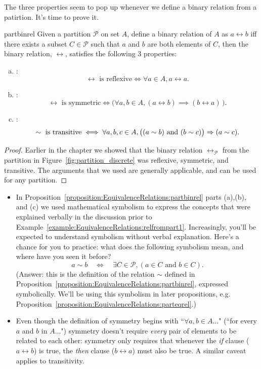 The three properties seem to pop up whenever we define a binary relation from a patirtion. It's time to prove it.

\begin{prop}{partbinrel} Given a partition $\mathcal{P}$ on set $A$, define a binary relation of $A$ as $a \rel b$ iff there exists a subset $C \in \mathcal{P}$ such that $a$ and $b$ are both elements of $C$, then the binary relation, $\rel$, satisfies the following 3 properties:
\begin{enumerate}[(a)]
\item {}:
	$$ \rel \text{ is reflexive} \iff \forall a \in A, a \rel a .$$
\item  {}:
	$$ \rel \text{ is symmetric} \iff \bigl( \forall a,b \in A,  (a \rel b) \implies (b \rel a)\, \bigr)  .$$
\item  {}:
	$$ \sim \text{ is transitive} \iff  \forall a,b,c \in A,  \bigl( (a \sim b) \mbox{ and } (b \sim c) \bigr) \Rightarrow (a \sim c)  .$$
\end{enumerate}
\end{prop}

\begin{proof}
Earlier in the chapter we showed that the binary relation $\rel_\mathcal{P}$ from the partition in Figure~\ref{fig:partition_discrete} was reflexive, symmetric, and transitive. The arguments that we used are generally applicable, and can be used for any partition.
\end{proof}

\begin{rem} 
\begin{itemize}
\item In Proposition~\ref{proposition:EquivalenceRelations:partbinrel} parts (a),(b), and (c) we used mathematical symbolism to express the concepts that were explained verbally in the discussion prior to Example~\ref{example:EquivalenceRelations:relfrompart1}. Increasingly, you'll be expected to understand symbolism without verbal explanation. Here's a chance for you to practice: what does the following symbolism mean, and where have you seen it before? 
\[ a \sim b \quad \iff \quad \exists C \in \mathcal{P}, ( a \in C \text{ and } b \in C ) .\]
(Answer: this is the definition of  the relation $\sim$  defined in Proposition~\ref{proposition:EquivalenceRelations:partbinrel}, expressed symbolically.
We'll be using this symbolism in later propositions, e.g. Proposition~\ref{proposition:EquivalenceRelations:parteqrel}.) 

\item Even though the definition of symmetry begins with ``$\forall a,b \in A \ldots$" (``for every $a$ and $b$ in $A \ldots$") symmetry doesn't require \emph{every} pair of elements to be related to each other: symmetry only requires that whenever the \emph{if} clause ($a \rel b$) is true, the \emph{then} clause ($b \rel a$) must also be true. A similar caveat applies to transitivity.
\end{itemize}
\end{rem}

